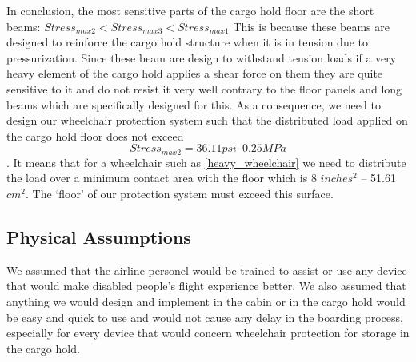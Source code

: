 In conclusion, the most sensitive parts of the cargo hold floor are the short beams:
$Stress_{max 2} < Stress_{max 3} < Stress_{max 1}$
 This is because these beams are designed to reinforce the cargo hold structure when it is in tension due to pressurization. Since these beam are design to withstand tension loads if a very heavy element of the cargo hold applies a shear force on them they are quite sensitive to it and do not resist it very well contrary to the floor panels and long beams which are specifically designed for this.
As a consequence, we need to design our wheelchair protection system such that the distributed load applied on the cargo hold floor does not exceed \[ Stress_{max 2} = 36.11 psi – 0.25 MPa\]. It means that for a wheelchair such as \ref{heavy_wheelchair} we need to distribute the load over a minimum contact area with the floor which is 8 $inches^2$ – 51.61 $cm^2$. The ‘floor’ of our protection system must exceed this surface.

\subsection{Physical Assumptions}

We assumed that the airline personel would be trained to assist or use any device that would make disabled people's flight experience better. We also assumed that anything we would design and implement in the cabin or in the cargo hold would be easy and quick to use and would not cause any delay in the boarding process, especially for every device that would concern wheelchair protection for storage in the cargo hold.

